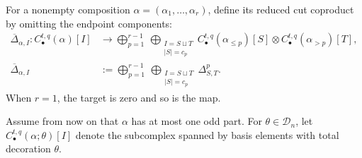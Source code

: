 \documentclass{amsart}
\theoremstyle{definition}
\theoremstyle{remark}
\begin{document}
For a nonempty composition $\alpha=(\alpha_1,\ldots,\alpha_r)$, define its
reduced cut coproduct by omitting the endpoint components:
\begin{equation}
\begin{split}
 \overline\Delta_{\alpha,I}:C_\bullet^{t,q}(\alpha)[I]
 &\longrightarrow
 \bigoplus_{p=1}^{r-1}
 \ \bigoplus_{\substack{I=S\sqcup T\\|S|=c_p}}
 C_\bullet^{t,q}(\alpha_{\leq p})[S]\otimes
 C_\bullet^{t,q}(\alpha_{>p})[T],\\
 \overline\Delta_{\alpha,I}
 &:=\bigoplus_{p=1}^{r-1}
   \ \bigoplus_{\substack{I=S\sqcup T\\|S|=c_p}}
   \Delta^p_{S,T}.
\end{split}
 \label{eq:reduced-cut-coproduct}
\end{equation}
When $r=1$, the target is zero and so is the map.

Assume from now on that $\alpha$ has at most one odd part.  For
$\theta\in\mathcal D_n$, let
$C_\bullet^{t,q}(\alpha;\theta)[I]$ denote the subcomplex spanned by basis
elements with total decoration $\theta$.
\end{document}
